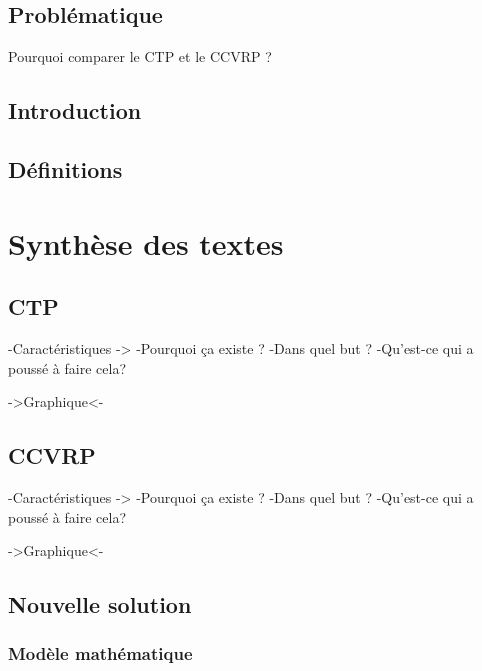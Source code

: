 \documentclass[12pt, a4paper, onecolumn, twoside,french,cleardoublepage=plain,openany]{article}
\begin{document}


\section{Problématique}\label{Problématique}

Pourquoi comparer le CTP et le CCVRP ?

\section{Introduction}\label{intro}

\section{Définitions}\label{def}

\chapter{Synthèse des textes}\label{Synthèse}

\section{CTP}\label{CTP}

-Caractéristiques
-> 
-Pourquoi ça existe ?
-Dans quel but ?
-Qu'est-ce qui a poussé à faire cela?

->Graphique<-

\section{CCVRP}\label{CCVRP}

-Caractéristiques
-> 
-Pourquoi ça existe ?
-Dans quel but ?
-Qu'est-ce qui a poussé à faire cela?

->Graphique<-

\section{Nouvelle solution}\label{NewSol}

\subsection{Modèle mathématique}\label{Modèle}
\end{document}
